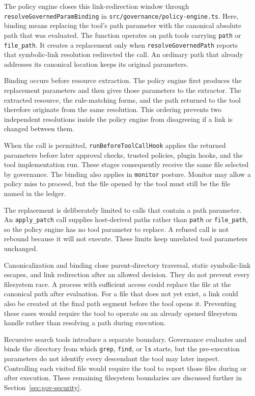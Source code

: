 The policy engine closes this link-redirection window through
\texttt{resolveGovernedParamBinding} in
\texttt{src/governance/policy-engine.ts}. Here, binding means replacing the
tool's path parameter with the canonical absolute path that was evaluated. The
function operates on path tools carrying \texttt{path} or
\texttt{file\_path}. It creates a replacement only when
\texttt{resolveGovernedPath} reports that symbolic-link resolution redirected
the call. An ordinary path that already addresses its canonical location keeps
its original parameters.

Binding occurs before resource extraction. The policy engine first produces
the replacement parameters and then gives those parameters to the extractor.
The extracted resource, the rule-matching forms, and the path returned to the
tool therefore originate from the same resolution. This ordering prevents two
independent resolutions inside the policy engine from disagreeing if a link is
changed between them.

When the call is permitted,
\texttt{runBeforeToolCallHook} applies the returned parameters before later
approval checks, trusted policies, plugin hooks, and the tool implementation
run. These stages consequently receive the same file selected by governance.
The binding also applies in \texttt{monitor} posture. Monitor may allow a
policy miss to proceed, but the file opened by the tool must still be the file
named in the ledger.

The replacement is deliberately limited to calls that contain a path parameter.
An \texttt{apply\_patch} call supplies host-derived paths rather than
\texttt{path} or \texttt{file\_path}, so the policy engine has no tool
parameter to replace. A refused call is not rebound because it will not
execute. These limits keep unrelated tool parameters unchanged.

Canonicalization and binding close parent-directory traversal, static
symbolic-link escapes, and link redirection after an allowed decision. They do
not prevent every filesystem race. A process with sufficient access could
replace the file at the canonical path after evaluation. For a file that does
not yet exist, a link could also be created at the final path segment before
the tool opens it. Preventing these cases would require the tool to operate on
an already opened filesystem handle rather than resolving a path during
execution.

Recursive search tools introduce a separate boundary. Governance evaluates and
binds the directory from which \texttt{grep}, \texttt{find}, or \texttt{ls}
starts, but the pre-execution parameters do not identify every descendant the
tool may later inspect. Controlling each visited file would require the tool to
report those files during or after execution. These remaining filesystem
boundaries are discussed further in Section~\ref{sec:gov-security}.

